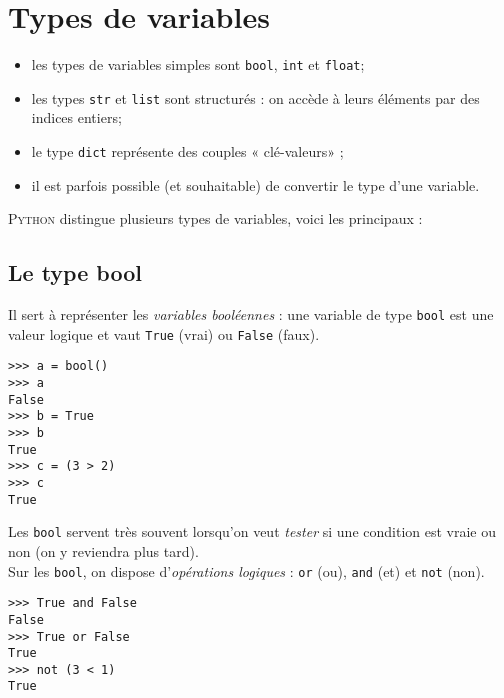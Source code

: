 \chapter{Types de variables}
\label{ch:types}
\begin{aretenir}
    \begin{itemize}
        \item 	les types de variables simples sont \texttt{bool}, \texttt{int} et \texttt{float};
        \item 	les types \texttt{str} et \texttt{list} sont structurés : on accède à leurs éléments par des indices entiers;
        \item 	le type \texttt{dict} représente des couples « clé-valeurs» ;
        \item 	il est parfois possible (et souhaitable) de convertir le type d'une variable.
    \end{itemize}
\end{aretenir}
\textsc{Python} distingue plusieurs types de variables, voici les principaux :
\section{Le type bool}
Il sert à représenter les \textit{variables booléennes} : une variable de type \texttt{bool} est une valeur logique et vaut \texttt{True} (vrai) ou
\texttt{False} (faux).


\begin{pys}\begin{verbatim}
>>> a = bool()
>>> a
False
>>> b = True
>>> b
True
>>> c = (3 > 2)
>>> c
True
\end{verbatim}
\end{pys}

Les \texttt{bool} servent très souvent lorsqu'on veut \textit{tester} si une condition est vraie ou non (on y reviendra plus tard).\\
Sur les \texttt{bool}, on dispose d'\textit{opérations logiques} : \texttt{or} (ou), \texttt{and} (et) et \texttt{not} (non).

\begin{pys}\begin{verbatim}
>>> True and False
False
>>> True or False
True
>>> not (3 < 1)
True
\end{verbatim}
\end{pys}

